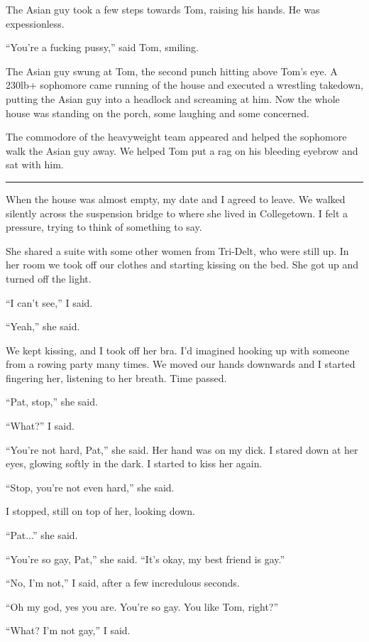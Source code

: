 The Asian guy took a few steps towards Tom, raising his hands.  He was
expessionless.

``You're a fucking pussy,'' said Tom, smiling. 

The Asian guy swung at Tom, the second punch hitting above Tom's eye.  A 230lb+
sophomore came running of the house and executed a wrestling takedown, putting
the Asian guy into a headlock and screaming at him.   Now the whole house was
standing on the porch, some laughing and some concerned.

The commodore of the heavyweight team appeared and helped the sophomore walk the
Asian guy away.  We helped Tom put a rag on his bleeding eyebrow and sat with
him.  

\plainfancybreak{12pt}{2}{* * *}

When the house was almost empty, my date and I agreed to leave.  We walked
silently across the suspension bridge to where she lived in Collegetown.  I felt
a pressure, trying to think of something to say.

She shared a suite with some other women from Tri-Delt, who were still up.  In
her room we took off our clothes and starting kissing on the bed.  She got up
and turned off the light.

``I can't see,'' I said.  

``Yeah,'' she said.

We kept kissing, and I took off her bra.  I'd imagined hooking up with someone
from a rowing party many times.  We moved our hands downwards and I started
fingering her, listening to her breath.  Time passed.

``Pat, stop,'' she said.

``What?'' I said.

``You're not hard, Pat,'' she said.  Her hand was on my dick.  I stared down at
her eyes, glowing softly in the dark.  I started to kiss her again.

``Stop, you're not even hard,'' she said.

I stopped, still on top of her, looking down.

``Pat...'' she said.

``You're so gay, Pat,'' she said.  ``It's okay, my best friend is gay.''

``No, I'm not,'' I said, after a few incredulous seconds.

``Oh my god, yes you are.  You're so gay.  You like Tom, right?''

``What?  I'm not gay,'' I said.


